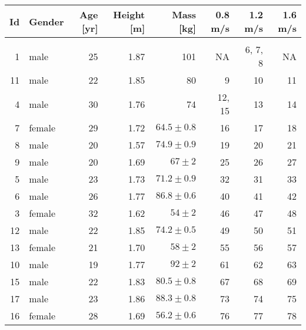 \begin{tabular}{rlrrrrrr}
\toprule
 Id &  Gender &  Age [yr] & Height [m] &                     Mass [kg] & 0.8 m/s &  1.2 m/s & 1.6 m/s \\
\midrule
    &         &           &            &                               &         &          &         \\
\midrule[0.25pt]
  1 &    male &        25 &       1.87 &                           101 &      NA &  6, 7, 8 &      NA \\
 11 &    male &        22 &       1.85 &                            80 &       9 &       10 &      11 \\
  4 &    male &        30 &       1.76 &                            74 &  12, 15 &       13 &      14 \\
\midrule[0.25pt]
  7 &  female &        29 &       1.72 &  $64.5\pm0.8$ &      16 &       17 &      18 \\
  8 &    male &        20 &       1.57 &  $74.9\pm0.9$ &      19 &       20 &      21 \\
  9 &    male &        20 &       1.69 &      $67\pm2$ &      25 &       26 &      27 \\
  5 &    male &        23 &       1.73 &  $71.2\pm0.9$ &      32 &       31 &      33 \\
  6 &    male &        26 &       1.77 &  $86.8\pm0.6$ &      40 &       41 &      42 \\
  3 &  female &        32 &       1.62 &      $54\pm2$ &      46 &       47 &      48 \\
 12 &    male &        22 &       1.85 &  $74.2\pm0.5$ &      49 &       50 &      51 \\
 13 &  female &        21 &       1.70 &      $58\pm2$ &      55 &       56 &      57 \\
 10 &    male &        19 &       1.77 &      $92\pm2$ &      61 &       62 &      63 \\
 15 &    male &        22 &       1.83 &  $80.5\pm0.8$ &      67 &       68 &      69 \\
 17 &    male &        23 &       1.86 &  $88.3\pm0.8$ &      73 &       74 &      75 \\
 16 &  female &        28 &       1.69 &  $56.2\pm0.6$ &      76 &       77 &      78 \\
\bottomrule
\end{tabular}
